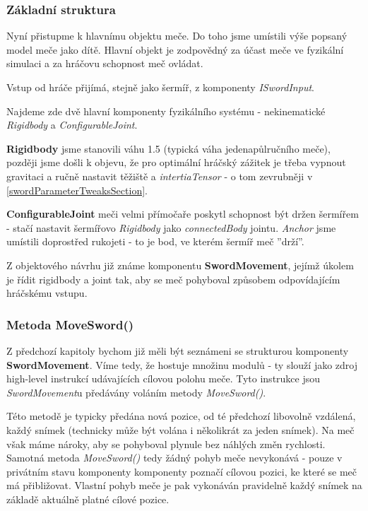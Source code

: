 \subsubsection*{Základní struktura} 

Nyní přistupme k hlavnímu objektu meče. Do toho jsme umístili výše popsaný model meče jako dítě. Hlavní objekt je zodpovědný za účast meče ve fyzikální simulaci a za hráčovu schopnost meč ovládat.

Vstup od hráče přijímá, stejně jako šermíř, z komponenty \textit{ISwordInput}.

Najdeme zde dvě hlavní komponenty fyzikálního systému - nekinematické \textit{Rigidbody} a \textit{ConfigurableJoint}.

\textbf{Rigidbody} jsme stanovili váhu 1.5 (typická váha jedenapůlručního meče), později jsme došli k objevu, že pro optimální hráčský zážitek je třeba vypnout gravitaci a ručně nastavit těžiště a \textit{intertiaTensor} - o tom zevrubněji v \ref{swordParameterTweaksSection}.

\textbf{ConfigurableJoint} meči velmi přímočaře poskytl schopnost být držen šermířem - stačí nastavit šermířovo \textit{Rigidbody} jako \textit{connectedBody} jointu. \textit{Anchor} jsme umístili doprostřed rukojeti - to je bod, ve kterém šermíř meč ''drží''. 

Z objektového návrhu již známe komponentu \textbf{SwordMovement}, jejímž úkolem je řídit rigidbody a joint tak, aby se meč pohyboval způsobem odpovídajícím hráčskému vstupu.


\subsubsection*{Metoda MoveSword()} \label{swordMovementMoveSwordImplementationSubsection}

Z předchozí kapitoly bychom již měli být seznámeni se strukturou komponenty \textbf{SwordMovement}. Víme tedy, že hostuje množinu modulů - ty slouží jako zdroj high-level instrukcí udávajících cílovou polohu meče. Tyto instrukce jsou \textit{SwordMovement}u předávány voláním metody \textit{MoveSword()}.

Této metodě je typicky předána nová pozice, od té předchozí libovolně vzdálená, každý snímek (technicky může být volána i několikrát za jeden snímek). Na meč však máme nároky, aby se pohyboval plynule bez náhlých změn rychlosti. Samotná metoda \textit{MoveSword()} tedy žádný pohyb meče nevykonává - pouze v privátním stavu komponenty komponenty poznačí cílovou pozici, ke které se meč má přibližovat. Vlastní pohyb meče je pak vykonáván pravidelně každý snímek na základě aktuálně platné cílové pozice.

